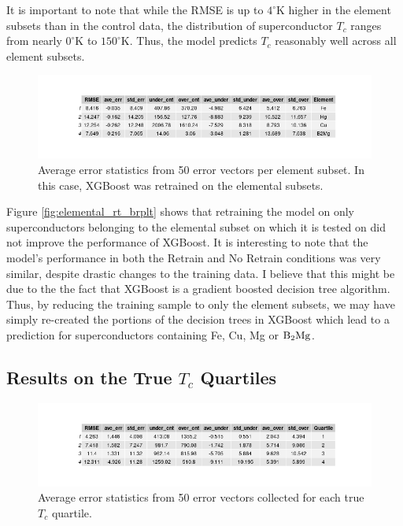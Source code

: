 \documentclass[oneside,12pt]{amsart}
\begin{document}
It is important to note that while the RMSE is up to $4^\circ$K higher in the element subsets than in the control data, the distribution of superconductor $T_c$ ranges from nearly $0^\circ$K to $150^\circ$K. Thus, the model predicts $T_c$ reasonably well across all element subsets.
 
\begin{figure}
     \centering
     \includegraphics[width = \linewidth]{../Plots/element_retrain_tbl.png}
     \caption{Average error statistics from 50 error vectors per element subset. In this case, XGBoost was retrained on the elemental subsets.}
     \label{fig:elemental_rt_tbl}
 \end{figure}

Figure \ref{fig:elemental_rt_brplt} shows that retraining the model on only superconductors belonging to the elemental subset on which it is tested on did not improve the performance of XGBoost. It is interesting to note that the model's performance in both the Retrain and No Retrain conditions was very similar, despite drastic changes to the training data. I believe that this might be due to the the fact that XGBoost is a gradient boosted decision tree algorithm. Thus, by reducing the training sample to only the element subsets, we may have simply re-created the portions of the decision trees in XGBoost which lead to a prediction for superconductors containing Fe, Cu, Mg or $\text B_2\text{Mg}$.

\subsection{Results on the True $T_c$ Quartiles}

 \begin{figure}
     \centering
     \includegraphics[width = \linewidth]{../Plots/quartile_true_tbl.png}
     \caption{Average error statistics from 50 error vectors collected for each true $T_c$ quartile.}
     \label{fig:quart_true_ave_tbl}	
 \end{figure}
 
\end{document}
